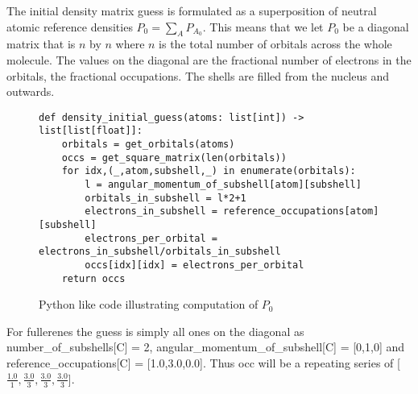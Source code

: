 The initial density matrix guess is formulated as a superposition of neutral atomic reference densities $P_0 = \sum_{A}P_{A_0}$. This means that we let $P_0$ be a diagonal matrix that is $n$ by $n$ where $n$ is the total number of orbitals across the whole molecule. The values on the diagonal are the fractional number of electrons in the orbitals, the fractional occupations. The shells are filled from the nucleus and outwards. 
\begin{figure}[H]
\begin{verbatim}
def density_initial_guess(atoms: list[int]) -> list[list[float]]:
    orbitals = get_orbitals(atoms)
    occs = get_square_matrix(len(orbitals))
    for idx,(_,atom,subshell,_) in enumerate(orbitals):
        l = angular_momentum_of_subshell[atom][subshell] 
        orbitals_in_subshell = l*2+1 
        electrons_in_subshell = reference_occupations[atom][subshell]
        electrons_per_orbital = electrons_in_subshell/orbitals_in_subshell
        occs[idx][idx] = electrons_per_orbital
    return occs
\end{verbatim}
\caption{Python like code illustrating computation of $P_0$}
\end{figure}
For fullerenes the guess is simply all ones on the diagonal as number\_of\_subshells[C] = 2, angular\_momentum\_of\_subshell[C] = [0,1,0] and reference\_occupations[C] = [1.0,3.0,0.0]. Thus occ will be a repeating series of [$\frac{1.0}{1},\frac{3.0}{3},\frac{3.0}{3},\frac{3.0}{3}$].


